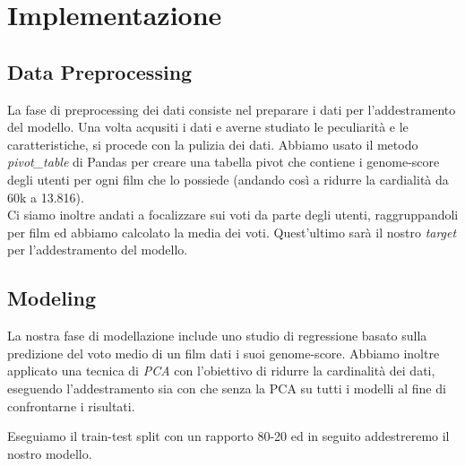 \documentclass[../../Report.tex]{subfiles}
\begin{document}
\chapter{Implementazione}
\section{Data Preprocessing}
La fase di preprocessing dei dati consiste nel preparare i dati per l'addestramento del modello.
Una volta acqusiti i dati e averne studiato le peculiarità e le caratteristiche, si procede con la pulizia dei dati.
Abbiamo usato il metodo \textit{pivot\_table} di Pandas per creare una tabella pivot che contiene i genome-score degli utenti per ogni film che lo possiede (andando così a ridurre la cardialità da 60k a 13.816).\\
Ci siamo inoltre andati a focalizzare sui voti da parte degli utenti, raggruppandoli per film ed abbiamo calcolato la media dei voti.
Quest'ultimo sarà il nostro \textit{target} per l'addestramento del modello.\\

\section{Modeling}
La nostra fase di modellazione include uno studio di regressione basato sulla predizione del voto medio di un film dati i suoi genome-score.
Abbiamo inoltre applicato una tecnica di \textit{PCA} con l'obiettivo di ridurre la cardinalità dei dati, eseguendo l'addestramento sia con che senza la PCA su tutti i modelli al fine di confrontarne i risultati.

Eseguiamo il train-test split con un rapporto 80-20 ed in seguito addestreremo il nostro modello.
\end{document}

